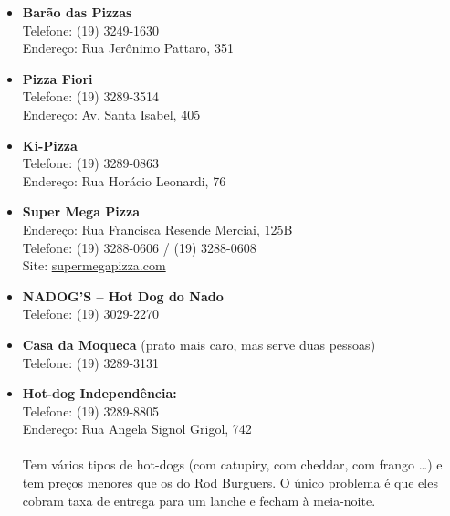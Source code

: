 \begin{itemize}
    \item   \textbf{Barão das Pizzas}
        \\Telefone: (19) 3249-1630
        \\Endereço: Rua Jerônimo Pattaro, 351

    \item   \textbf{Pizza Fiori}
        \\Telefone: (19) 3289-3514
        \\Endereço: Av. Santa Isabel, 405

    \item   \textbf{Ki-Pizza}
        \\Telefone: (19) 3289-0863
        \\Endereço: Rua Horácio Leonardi, 76

    \item   \textbf{Super Mega Pizza}
        \\Endereço: Rua Francisca Resende Merciai, 125B
        \\Telefone: (19) 3288-0606 / (19) 3288-0608
        \\Site: \url{supermegapizza.com}

    \item   \textbf{NADOG'S -- Hot Dog do Nado}
        \\Telefone: (19) 3029-2270

    \item   \textbf{Casa da Moqueca} (prato mais caro, mas serve duas pessoas)
        \\Telefone: (19) 3289-3131
    


    \item   \textbf{Hot-dog Independência:}
        \\Telefone: (19) 3289-8805
        \\Endereço: Rua Angela Signol Grigol, 742
        \\\\
        Tem vários tipos de hot-dogs (com catupiry, com cheddar, com frango
        {\dots}) e tem preços menores que os do Rod Burguers. O único problema é
        que eles cobram taxa de entrega para um lanche e fecham à meia-noite.


\end{itemize}
